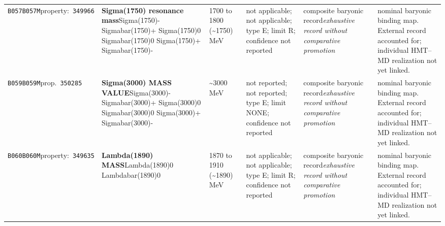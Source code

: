 \begin{landscape}
\begin{longtable}{L{1.85cm}L{4.45cm}L{2.35cm}L{4.05cm}L{3.35cm}L{7.15cm}}
\texttt{B057}\newline \texttt{B057M}\newline property:\ \texttt{349966} & \textbf{Sigma(1750) resonance mass}\newline Sigma(1750)- \textbar{}\allowbreak{} Sigmabar(1750)+ \textbar{}\allowbreak{} Sigma(1750)0 \textbar{}\allowbreak{} Sigmabar(1750)0 \textbar{}\allowbreak{} Sigma(1750)+ \textbar{}\allowbreak{} Sigmabar(1750)- & 1700 to 1800 (\textasciitilde{}1750)\,MeV & not applicable; not applicable; type E; limit R; confidence not reported & composite baryonic record\newline \emph{exhaustive record without comparative promotion} & nominal baryonic binding map. External record accounted for; individual HMT--MD realization not yet linked. \\
\texttt{B059}\newline \texttt{B059M}\newline prop.\ \texttt{350285} & \textbf{Sigma(3000) MASS VALUE}\newline Sigma(3000)- \textbar{}\allowbreak{} Sigmabar(3000)+ \textbar{}\allowbreak{} Sigma(3000)0 \textbar{}\allowbreak{} Sigmabar(3000)0 \textbar{}\allowbreak{} Sigma(3000)+ \textbar{}\allowbreak{} Sigmabar(3000)- & \textasciitilde{}3000\,MeV & not reported; not reported; type E; limit NONE; confidence not reported & composite baryonic record\newline \emph{exhaustive record without comparative promotion} & nominal baryonic binding map. External record accounted for; individual HMT--MD realization not yet linked. \\
\texttt{B060}\newline \texttt{B060M}\newline property:\ \texttt{349635} & \textbf{Lambda(1890) MASS}\newline Lambda(1890)0 \textbar{}\allowbreak{} Lambdabar(1890)0 & 1870 to 1910 (\textasciitilde{}1890)\,MeV & not applicable; not applicable; type E; limit R; confidence not reported & composite baryonic record\newline \emph{exhaustive record without comparative promotion} & nominal baryonic binding map. External record accounted for; individual HMT--MD realization not yet linked. \\

\end{longtable}
\end{landscape}
